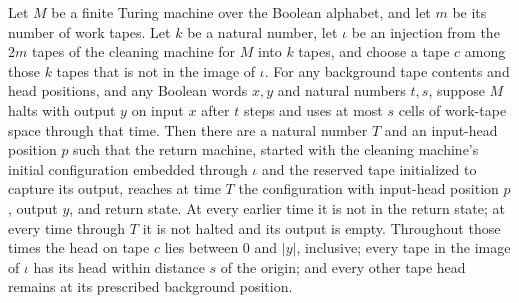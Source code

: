 \begin{theorem}
\label{Complexity.b2b_clean_capture}
\leanok
{}
Let $M$ be a finite Turing machine over the Boolean alphabet, and let $m$ be its number
of work tapes. Let $k$ be a natural number, let $\iota$ be an injection from the $2m$
tapes of the cleaning machine for $M$ into $k$ tapes, and choose a tape $c$ among those
$k$ tapes that is not in the image of $\iota$. For any background tape contents and head
positions, and any Boolean words $x,y$ and natural numbers $t,s$, suppose $M$ halts with
output $y$ on input $x$ after $t$ steps and uses at most $s$ cells of work-tape space
through that time. Then there are a natural number $T$ and an input-head position $p$
such that the return machine, started with the cleaning machine’s initial configuration
embedded through $\iota$ and the reserved tape initialized to capture its output,
reaches at time $T$ the configuration with input-head position $p$, output $y$, and
return state. At every earlier time it is not in the return state; at every time through
$T$ it is not halted and its output is empty. Throughout those times the head on tape
$c$ lies between $0$ and $|y|$, inclusive; every tape in the image of $\iota$ has its
head within distance $s$ of the origin; and every other tape head remains at its
prescribed background position.
\end{theorem}

